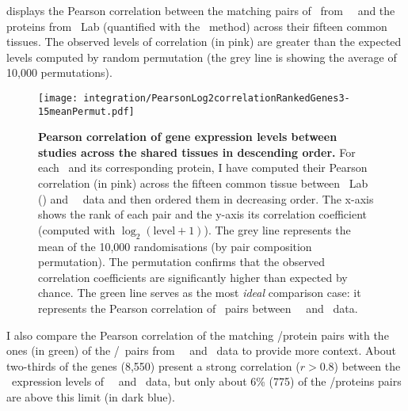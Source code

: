  displays the Pearson correlation
between the matching pairs of \mRNAs\ from \uhlen\ \etal\
and the proteins from \pandey\ Lab (quantified with the \PPKM\ method)
across their fifteen common tissues.
The observed levels of correlation (in pink) are greater
than the expected levels computed by random permutation
(the grey line is showing the average of 10,000 permutations).

\vspace{-4mm}
\begin{figure}[!htb]
    \texttt{[image: integration/PearsonLog2correlationRankedGenes3-15meanPermut.pdf]}\centering
    \vspace{-3mm}
    \caption[Pearson correlation coefficients of gene expression levels
    between studies in descending order]%
    {\label{fig:GeneProtCor}\textbf{Pearson correlation of gene expression levels
    between studies across the shared tissues in descending order.}
    For each \mRNA\ and its corresponding protein,
    I have computed their Pearson correlation (in pink)
    across the fifteen common tissue
    between \pandey\ Lab (\PPKM) and \uhlen\ \etal\ data
    and then ordered them in decreasing order.
    The x-axis shows the rank of each pair
    and the y-axis its correlation coefficient
    (computed with $\log_2(\text{level}+1)$).
    The grey line represents the mean of the 10,000 randomisations
    (by pair composition permutation).
    The permutation confirms that the observed correlation coefficients are
    significantly higher than expected by chance.
    The green line serves as the most \emph{ideal} comparison case:
    it represents the Pearson correlation of \mRNAs\ pairs
    between \uhlen\ \etal\ and \gtex\ data.
    }
    \vspace{-1em}
\end{figure}

I also compare the Pearson correlation of the matching \mRNAs/protein pairs
with the ones (in green) of the \mRNAs{}/\mRNAs\ pairs
from \uhlen\ \etal\ and \gtex\ data
to provide more context.
About two-thirds of the genes (8,550) present a strong correlation
($r>0.8$)
between the \mRNA\ expression levels of \uhlen\ \etal\ and \gtex\ data,
but only about 6\% (775) of the \mRNA/proteins pairs are above this limit
(in dark blue).

